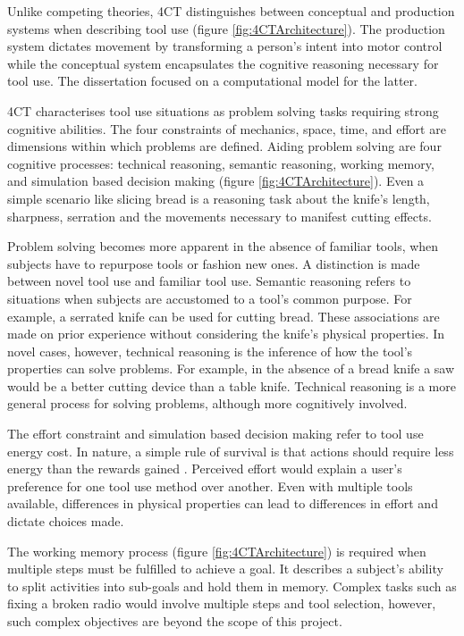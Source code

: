 \documentclass[11]{article}
\begin{document}
Unlike competing theories, 4CT distinguishes between conceptual and production systems when describing tool use (figure \ref{fig:4CTArchitecture}).
The production system dictates movement by transforming a person's intent into motor control while the conceptual system encapsulates the cognitive reasoning necessary for tool use.
The dissertation focused on a computational model for the latter.



4CT characterises tool use situations as problem solving tasks requiring strong cognitive abilities. 
The four constraints of mechanics, space, time, and effort are dimensions within which problems are defined.
Aiding problem solving are four cognitive processes: technical reasoning, semantic reasoning, working memory, and simulation based decision making (figure \ref{fig:4CTArchitecture}).  
Even a simple scenario like slicing bread is a reasoning task about the knife's length, sharpness, serration and the movements necessary to manifest cutting effects. 

Problem solving becomes more apparent in the absence of familiar tools, when subjects have to repurpose tools or fashion new ones.
A distinction is made between novel tool use and familiar tool use. 
Semantic reasoning refers to situations when subjects are accustomed to a tool's common purpose. 
For example, a serrated knife can be used for cutting bread. 
These associations are made on prior experience without considering the knife's physical properties.  
In novel cases, however, technical reasoning is the inference of how the tool's properties can solve problems.
For example, in the absence of a bread knife a saw would be a better cutting device than a table knife. 
Technical reasoning is a more general process for solving problems, although more cognitively involved.  

The effort constraint and simulation based decision making refer to tool use energy cost. 
In nature, a simple rule of survival is that actions should require less energy than the rewards gained \cite{proffitt2006}.
Perceived effort would explain a user's preference for one tool use method over another. 
Even with multiple tools available, differences in physical properties can lead to differences in effort and dictate choices made. 

The working memory process (figure \ref{fig:4CTArchitecture}) is required when multiple steps must be fulfilled to achieve a goal. 
It describes a subject's ability to split activities into sub-goals and hold them in memory. 
Complex tasks such as fixing a broken radio would involve multiple steps and tool selection, however, such complex objectives are beyond the scope of this project.
\end{document}
